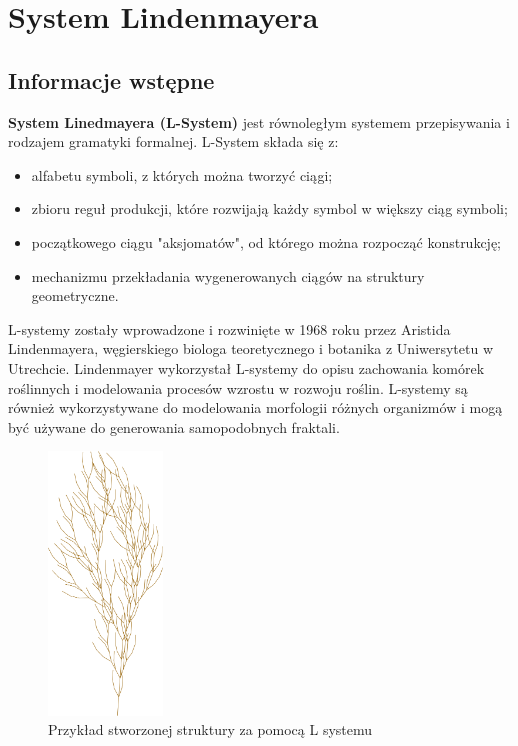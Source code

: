 \documentclass[a4paper,12pt,oneside]{book} %
\begin{document}


\chapter{System Lindenmayera} 


\section{Informacje wstępne}
\textbf{System Linedmayera (L-System)} jest równoległym systemem przepisywania i 
rodzajem gramatyki formalnej. L-System składa się z:

\begin{itemize}
    \item alfabetu symboli, z których można tworzyć ciągi;
    \item zbioru reguł produkcji, które rozwijają każdy symbol w większy ciąg symboli;
    \item początkowego ciągu "aksjomatów", od którego można rozpocząć konstrukcję;
    \item mechanizmu przekładania wygenerowanych ciągów na struktury geometryczne.
\end{itemize}

L-systemy zostały wprowadzone i rozwinięte w 1968 roku przez Aristida Lindenmayera,
węgierskiego biologa teoretycznego i botanika z Uniwersytetu w Utrechcie.
Lindenmayer wykorzystał L-systemy do opisu zachowania komórek roślinnych i
modelowania procesów wzrostu w rozwoju roślin.
L-systemy są również wykorzystywane do modelowania morfologii różnych
organizmów i mogą być używane do generowania samopodobnych fraktali.
\begin{figure}[h]
	\centering\includegraphics[height=7cm]{L-system-fractal.svg.png}
	\caption{Przykład stworzonej struktury za pomocą L systemu}
    \label{fig:lsystreeexample}
\end{figure}
\end{document}
